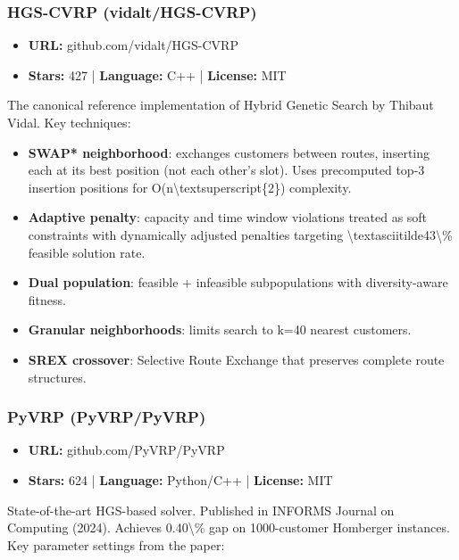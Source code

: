 \documentclass[twocolumn,10pt,letterpaper]{article}
\begin{document}
\subsubsection{HGS-CVRP (vidalt/HGS-CVRP)}

\begin{itemize}
\setlength{\itemsep}{0pt}
\setlength{\parskip}{0pt}
  \item \textbf{URL:} github.com/vidalt/HGS-CVRP
  \item \textbf{Stars:} 427 | \textbf{Language:} C++ | \textbf{License:} MIT
\end{itemize}

The canonical reference implementation of Hybrid Genetic Search by Thibaut Vidal. Key techniques:


\begin{itemize}
\setlength{\itemsep}{0pt}
\setlength{\parskip}{0pt}
  \item \textbf{SWAP* neighborhood}: exchanges customers between routes, inserting each at its best position (not each other's slot). Uses precomputed top-3 insertion positions for O(n\textbackslash{}textsuperscript\{2\}) complexity.
  \item \textbf{Adaptive penalty}: capacity and time window violations treated as soft constraints with dynamically adjusted penalties targeting \textbackslash{}textasciitilde43\textbackslash{}\% feasible solution rate.
  \item \textbf{Dual population}: feasible + infeasible subpopulations with diversity-aware fitness.
  \item \textbf{Granular neighborhoods}: limits search to k=40 nearest customers.
  \item \textbf{SREX crossover}: Selective Route Exchange that preserves complete route structures.
\end{itemize}

\subsubsection{PyVRP (PyVRP/PyVRP)}

\begin{itemize}
\setlength{\itemsep}{0pt}
\setlength{\parskip}{0pt}
  \item \textbf{URL:} github.com/PyVRP/PyVRP
  \item \textbf{Stars:} 624 | \textbf{Language:} Python/C++ | \textbf{License:} MIT
\end{itemize}

State-of-the-art HGS-based solver. Published in INFORMS Journal on Computing (2024). Achieves 0.40\textbackslash{}\% gap on 1000-customer Homberger instances. Key parameter settings from the paper:
\end{document}

